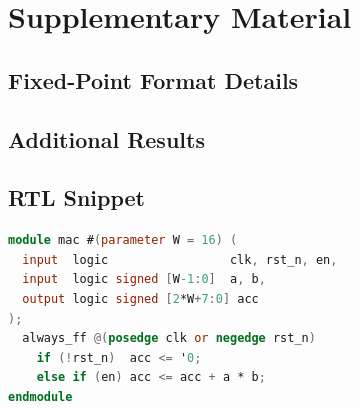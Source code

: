 \section{Supplementary Material}
\label{sec:appendix}

\subsection{Fixed-Point Format Details}

\subsection{Additional Results}

\subsection{RTL Snippet}
\begin{lstlisting}[language=Verilog,caption={Example: pipelined MAC unit (placeholder).}]
module mac #(parameter W = 16) (
  input  logic                 clk, rst_n, en,
  input  logic signed [W-1:0]  a, b,
  output logic signed [2*W+7:0] acc
);
  always_ff @(posedge clk or negedge rst_n)
    if (!rst_n)  acc <= '0;
    else if (en) acc <= acc + a * b;
endmodule
\end{lstlisting}
